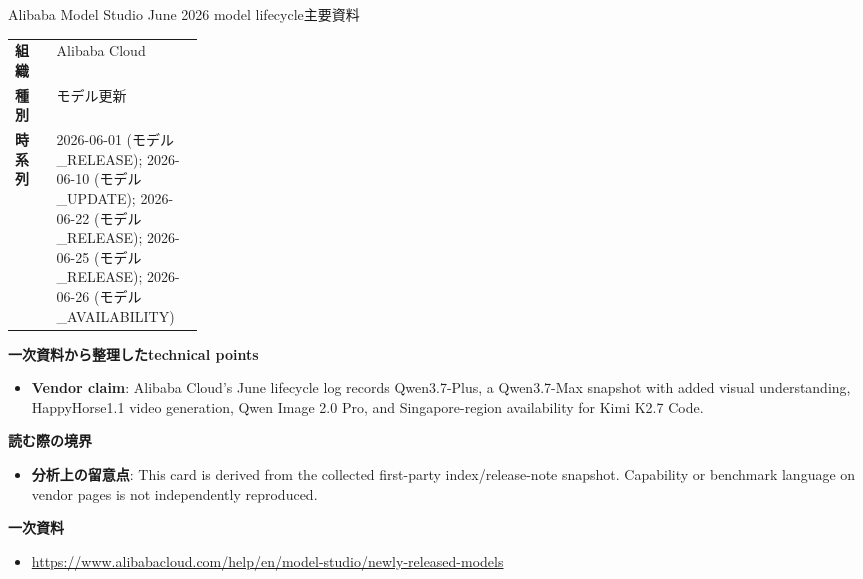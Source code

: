 \begin{technicalnote}{Alibaba Model Studio June 2026 model lifecycle}{主要資料}
\begin{tabularx}{\linewidth}{@{}>{\bfseries}p{0.22\linewidth}X@{}}
組織 & Alibaba Cloud \\
種別 & モデル更新 \\
時系列 & 2026-06-01 (モデル\_RELEASE); 2026-06-10 (モデル\_UPDATE); 2026-06-22 (モデル\_RELEASE); 2026-06-25 (モデル\_RELEASE); 2026-06-26 (モデル\_AVAILABILITY) \\
\end{tabularx}
\smallskip
{\bfseries 一次資料から整理したtechnical points}
\begin{itemize}[leftmargin=1.5em,itemsep=0.35em]
\item \textbf{Vendor claim}: Alibaba Cloud's June lifecycle log records Qwen3.7-Plus, a Qwen3.7-Max snapshot with added visual understanding, HappyHorse1.1 video generation, Qwen Image 2.0 Pro, and Singapore-region availability for Kimi K2.7 Code.
\end{itemize}
{\bfseries 読む際の境界}
\begin{itemize}[leftmargin=1.5em,itemsep=0.35em]
\item \textbf{分析上の留意点}: This card is derived from the collected first-party index/release-note snapshot. Capability or benchmark language on vendor pages is not independently reproduced.
\end{itemize}
{\bfseries 一次資料}
\begingroup\sloppy
\begin{itemize}[leftmargin=1.5em,itemsep=0.25em]
\item {\scriptsize\url{https://www.alibabacloud.com/help/en/model-studio/newly-released-models}}
\end{itemize}
\endgroup
\end{technicalnote}
\medskip


